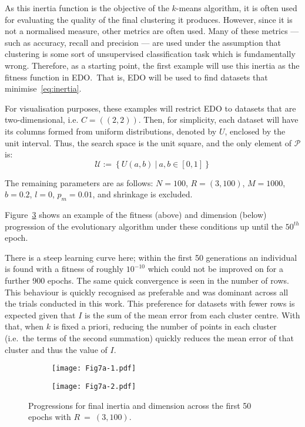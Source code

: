 As this inertia function is the objective of the \(k\)-means algorithm, it is
often used for evaluating the quality of the final clustering it produces.
However, since it is not a normalised measure, other metrics are often used.
Many of these metrics --- such as accuracy, recall and precision --- are used
under the assumption that clustering is some sort of unsupervised classification
task which is fundamentally wrong. Therefore, as a starting point, the first
example will use this inertia as the fitness function in EDO.\ That is, EDO will
be used to find datasets that minimise~\eqref{eq:inertia}.

For visualisation purposes, these examples will restrict EDO to datasets that
are two-dimensional, i.e. \(C = ((2, 2))\). Then, for simplicity, each dataset
will have its columns formed from uniform distributions, denoted by \(U\),
enclosed by the unit interval. Thus, the search space is the unit square, and
the only element of \(\mathcal{P}\) is:
\begin{equation}
    \mathcal{U} := \left\{U(a, b)~|~a, b \in [0, 1]\right\}
\end{equation}

The remaining parameters are as follows: \(N=100\), \(R=(3,100)\), \(M=1000\),
\(b=0.2\), \(l=0\), \(p_m=0.01\), and shrinkage is excluded.

Figure~\ref{fig:small-inertia-50} shows an example of the fitness (above) and
dimension (below) progression of the evolutionary algorithm under these
conditions up until the \(50^{th}\) epoch.

There is a steep learning curve here; within the first 50 generations an
individual is found with a fitness of roughly \(10^{-10}\) which could not be
improved on for a further 900 epochs. The same quick convergence is seen in the
number of rows. This behaviour is quickly recognised as preferable and was
dominant across all the trials conducted in this work. This preference for
datasets with fewer rows is expected given that \(I\) is the sum of the mean
error from each cluster centre. With that, when \(k\) is fixed a priori,
reducing the number of points in each cluster (i.e.\ the terms of the second
summation) quickly reduces the mean error of that cluster and thus the value of
\(I\).

\begin{figure}[htbp]
    \centering
    \begin{subfigure}{\imgwidth}
        \texttt{[image: Fig7a-1.pdf]}
        \label{fig:edo:inertia:small:fitness}
    \end{subfigure}

    \begin{subfigure}{\imgwidth}
        \texttt{[image: Fig7a-2.pdf]}
        \label{fig:edo:inertia:small:dimension}
    \end{subfigure}
    \caption{%
        Progressions for final inertia and dimension across the first 50
        epochs with \(R~=~(3,100)\).
    }\label{fig:small-inertia-50}
\end{figure}

